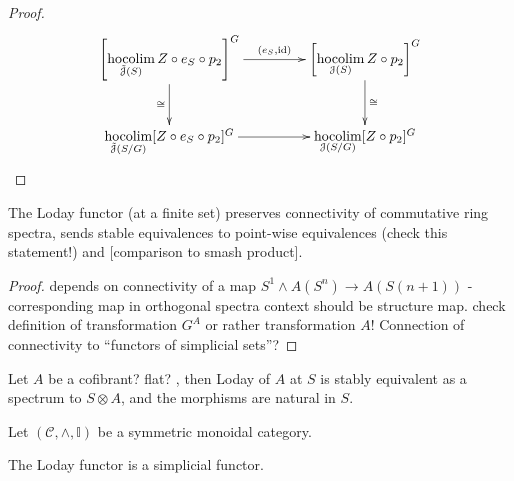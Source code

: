 \begin{lem}
\begin{proof}
      \begin{displaymath}
        \xymatrix@C+2em{
          \left[ \hocolim\limits_{\tilde{\cJ}(S)} Z \circ e_S \circ p_2
            \right]^G
            \ar[r]^-{(e_S, \id)}
            \ar[d]_-{\cong}
          &
          \left[\hocolim\limits_{\cJ(S)} Z \circ p_2 \right]^G
            \ar[d]^-{\cong}
          \\
          \hocolim\limits_{\tilde{\cJ}(S/G)} [Z \circ e_S \circ p_2]^G
            \ar[r]
          &
          \hocolim\limits_{\cJ(S/G)} [Z \circ p_2 ]^G
        }
      \end{displaymath}
    \end{proof}
  \end{lem}
  \begin{lem}\label{lem_loday_functor_preserves_connectivity}
    The Loday functor (at a finite set) preserves connectivity of commutative
    ring spectra, sends stable equivalences to point-wise equivalences (check
    this statement!) and [comparison to smash product].
    \begin{proof}
      depends on connectivity of a map $S^1 \wedge A(S^n) \to A(S(n+1))$ -
      corresponding map in orthogonal spectra context should be structure map.
      check definition of transformation $G^A$ or rather transformation $A$!
      Connection of connectivity to ``functors of simplicial sets''?
    \end{proof}
  \end{lem}
  \begin{cor}\label{cor_loday_at_S_naturally_equivalent_to_tensor_with_S}
    Let $A$ be a cofibrant? flat? \hring, then Loday of $A$ at $S$ is stably
    equivalent as a spectrum to $S \otimes A$, and the morphisms are natural in
    $S$.
  \end{cor}
  \begin{defn}\label{def_loday_functor_in_symmetric_monoidal_category} 
    Let $(\mathcal{C},\wedge, \mathbb{I})$ be a symmetric monoidal category.\\
  \end{defn}
  \begin{lem}\label{lem_loday_functor_is_simplicial}
    The Loday functor is a simplicial functor.\\
  \end{lem}

